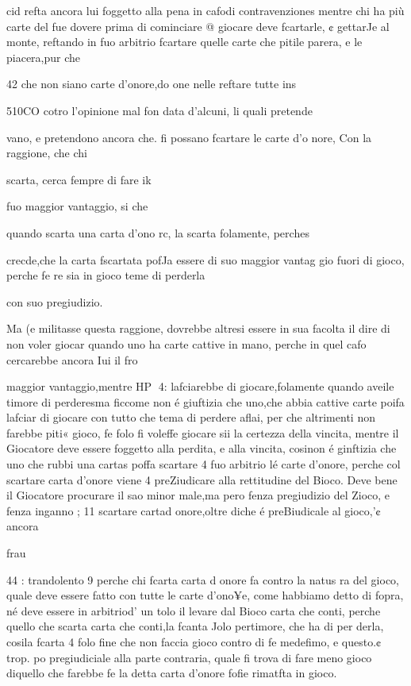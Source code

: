 \documentclass[11pt,a6paper]{article}
\begin{document}
cid refta ancora lui foggetto alla
pena in cafodi contravenziones
mentre chi ha più carte del fue
dovere prima di cominciare @
giocare deve fcartarle, ¢ gettarJe al monte, reftando in fuo arbitrio fcartare quelle carte che
pitile parera, e le piacera,pur
che
 

 

 

42
che non siano carte d’onore,do
one nelle reftare tutte ins

510CO cotro l’opinione mal fon
data d’alcuni, li quali pretende~

vano, e pretendono ancora che.
fi possano fcartare le carte d’o
nore, Con la raggione, che chi

scarta, cerca fempre di fare ik

fuo maggior vantaggio, si che

quando scarta una carta d’ono
rc, la scarta folamente, perches

crecde,che la carta fscartata pofJa essere di suo maggior vantag
gio fuori di gioco, perche fe re
sia in gioco teme di perderla

con suo pregiudizio.

Ma (e militasse questa raggione, dovrebbe altresi essere in
sua facolta il dire di non voler
giocar quando uno ha carte cattive in mano, perche in quel cafo cercarebbe ancora Iui il fro

maggior vantaggio,mentre HP
4:
lafciarebbe di giocare,folamente quando aveile timore di perderesma ficcome non é giuftizia
che uno,che abbia cattive carte
poifa lafciar di giocare con tutto che tema di perdere aflai, per
che altrimenti non farebbe piti«
gioco, fe folo fi voleffe giocare
sii la certezza della vincita,
mentre il Giocatore deve essere foggetto alla perdita, e alla vincita, cosinon é ginftizia
che uno che rubbi una cartas
poffa scartare 4 fuo arbitrio lé
carte d’onore, perche col scartare carta d’onore viene 4 preZiudicare alla rettitudine del
Bioco. Deve bene il Giocatore
procurare il sao minor male,ma
pero fenza pregiudizio del Zioco, e fenza inganno ; 11 scartare
cartad onore,oltre diche é preBiudicale al gioco,'¢ ancora

frau
 
 

 

 

 

 

 

44 :
trandolento 9 perche chi fcarta
carta d onore fa contro la natus
ra del gioco, quale deve essere
fatto con tutte le carte d’ono¥e, come habbiamo detto di fopra, né deve essere in arbitriod’
un tolo il levare dal Bioco carta
che conti, perche quello che
scarta carta che conti,la fcanta
Jolo pertimore, che ha di per
derla, cosila fcarta 4 folo fine
che non faccia gioco contro di
fe medefimo, e questo.¢ trop.
po pregiudiciale alla parte contraria, quale fi trova di fare meno gioco diquello che farebbe
fe la detta carta d’onore fofie
rimatfta in gioco.
\end{document}
